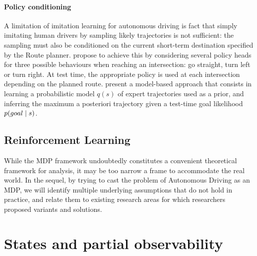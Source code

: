 \paragraph{Policy conditioning} A limitation of imitation learning for autonomous driving is fact that simply imitating human drivers by sampling likely trajectories is not sufficient: the sampling must also be conditioned on the current short-term destination specified by the Route planner. \citet{Codevilla2018} propose to achieve this by considering several policy heads for three possible behaviours when reaching an intersection: go straight, turn left or turn right. At test time, the appropriate policy is used at each intersection depending on the planned route. \citet{Rhinehart2019,Rhinehart2020} present a model-based approach that consists in learning a probabilistic model $q(s)$ of expert trajectories used as a prior, and inferring the maximum a posteriori trajectory given a test-time goal likelihood $p\lparen goal\mid s\rparen$.

\subsection{Reinforcement Learning}

While the \gls{MDP} framework undoubtedly constitutes a convenient theoretical framework for analysis, it may be too narrow a frame to accommodate the real world. In the sequel, by trying to cast the problem of Autonomous Driving as an \gls{MDP}, we will identify multiple underlying assumptions that do not hold in practice, and relate them to existing research areas for which researchers proposed variants and solutions.

\section{States and partial observability}
\label{sec:partial-observability}

